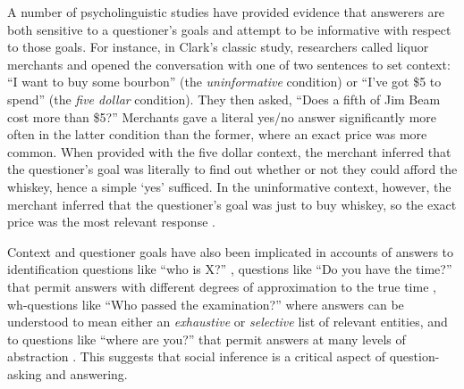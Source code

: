 \documentclass[12pt, floatsintext, jou]{apa6}
\begin{document}
A number of psycholinguistic studies have provided evidence that answerers are both sensitive to a questioner's goals and attempt to be informative with respect to those goals.
For instance, in Clark's \citeyear{Clark79_IndirectSpeechActs} classic study, researchers called liquor merchants and opened the conversation with one of two sentences to set context: ``I want to buy some bourbon'' (the \emph{uninformative} condition) or ``I've got \$5 to spend'' (the \emph{five dollar} condition). They then asked, ``Does a fifth of Jim Beam cost more than \$5?'' Merchants gave a literal yes/no answer significantly more often in the latter condition than the former, where an exact price was more common. When provided with the five dollar context, the merchant inferred that the questioner's goal was literally to find out whether or not they could afford the whiskey, hence a simple `yes'  sufficed. In the uninformative context, however, the merchant inferred that the questioner's goal was just to buy whiskey, so the exact price was the most relevant response \cite{Clark79_IndirectSpeechActs}. 

Context and questioner goals have also been implicated in accounts of answers to identification questions like ``who is X?'' \cite{BoerLycan75_KnowingWho}, questions like ``Do you have the time?'' that permit answers with different degrees of approximation to the true time \cite{DerHenstCarlesSperber02_RelevanceTellingTime, GibbsBryant08_OptimalRelevance}, wh-questions like ``Who passed the examination?'' where answers can be understood to mean either an \emph{exhaustive} or \emph{selective} list of relevant entities, and to questions like ``where are you?'' that permit answers at many levels of abstraction \cite{Potts12_CardsDialogueCorpus}. This suggests that social inference is a critical aspect of question-asking and answering. %



\end{document}
